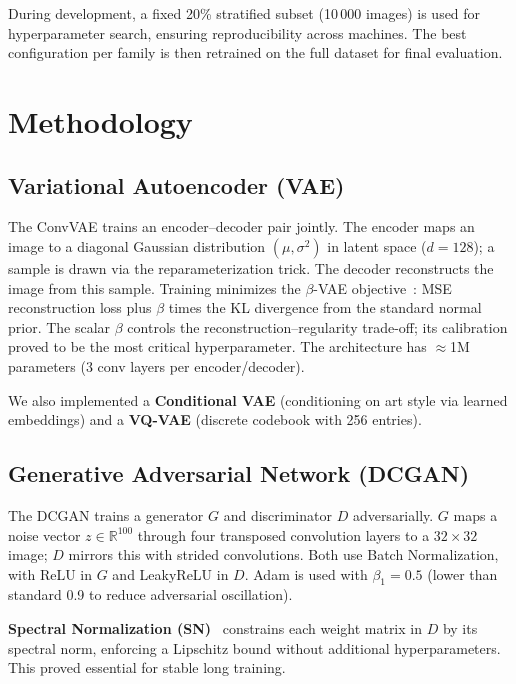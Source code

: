 \documentclass[runningheads]{llncs}
\begin{document}
During development, a fixed 20\% stratified subset (10\,000 images) is used for hyperparameter search, ensuring reproducibility across machines. The best configuration per family is then retrained on the full dataset for final evaluation.

\section{Methodology}\label{sec:methodology}

\subsection{Variational Autoencoder (VAE)}

The ConvVAE trains an encoder--decoder pair jointly. The encoder maps an image to a diagonal Gaussian distribution $(\mu, \sigma^2)$ in latent space ($d=128$); a sample is drawn via the reparameterization trick. The decoder reconstructs the image from this sample. Training minimizes the $\beta$-VAE objective~\cite{higgins2017}: MSE reconstruction loss plus $\beta$ times the KL divergence from the standard normal prior. The scalar $\beta$ controls the reconstruction--regularity trade-off; its calibration proved to be the most critical hyperparameter. The architecture has $\approx$1M parameters (3 conv layers per encoder/decoder).

We also implemented a \textbf{Conditional VAE} (conditioning on art style via learned embeddings) and a \textbf{VQ-VAE} (discrete codebook with 256 entries).

\subsection{Generative Adversarial Network (DCGAN)}

The DCGAN trains a generator $G$ and discriminator $D$ adversarially. $G$ maps a noise vector $z \in \mathbb{R}^{100}$ through four transposed convolution layers to a $32\times 32$ image; $D$ mirrors this with strided convolutions. Both use Batch Normalization, with ReLU in $G$ and LeakyReLU in $D$. Adam is used with $\beta_1=0.5$ (lower than standard 0.9 to reduce adversarial oscillation).

\textbf{Spectral Normalization (SN)}~\cite{miyato2018} constrains each weight matrix in $D$ by its spectral norm, enforcing a Lipschitz bound without additional hyperparameters. This proved essential for stable long training.
\end{document}
